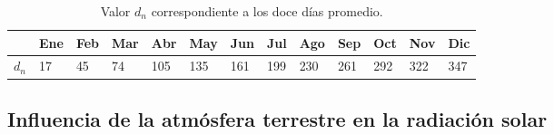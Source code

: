 \begin{center}
{\footnotesize }%
\begin{table}
{\footnotesize \caption{Valor $d_{n}$ correspondiente a los doce días promedio.\label{tab:DiasPromedio}}
}{\footnotesize \par}

\centering{}{\footnotesize }\begin{tabular}{>{\centering}p{6mm}>{\centering}m{4mm}>{\centering}m{4mm}>{\centering}m{4mm}>{\centering}m{4mm}>{\centering}m{4mm}>{\centering}m{4mm}>{\centering}m{4mm}>{\centering}m{4mm}>{\centering}m{4mm}>{\centering}m{4mm}>{\centering}m{4mm}>{\centering}m{3mm}}
\toprule 
{\footnotesize Mes} & {\footnotesize Ene} & {\footnotesize Feb} & {\footnotesize Mar} & {\footnotesize Abr} & {\footnotesize May} & {\footnotesize Jun} & {\footnotesize Jul} & {\footnotesize Ago} & {\footnotesize Sep} & {\footnotesize Oct} & {\footnotesize Nov} & {\footnotesize Dic}\tabularnewline
\midrule
$d_{n}$ & {\footnotesize 17} & {\footnotesize 45} & {\footnotesize 74} & {\footnotesize 105} & {\footnotesize 135} & {\footnotesize 161} & {\footnotesize 199} & {\footnotesize 230} & {\footnotesize 261} & {\footnotesize 292} & {\footnotesize 322} & {\footnotesize 347}\tabularnewline
\bottomrule
\end{tabular}
\end{table}

\par\end{center}{\footnotesize \par}


\subsection{Influencia de la atmósfera terrestre en la radiación solar}

